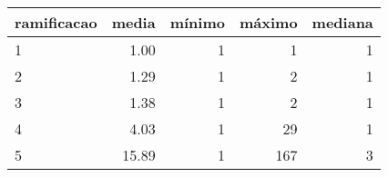 \begin{table}[ht]
\centering
\begin{tabular}{lrrrr}
  \hline
ramificacao & media & mínimo & máximo & mediana \\ 
  \hline
1 & 1.00 &   1 &   1 &   1 \\ 
  2 & 1.29 &   1 &   2 &   1 \\ 
  3 & 1.38 &   1 &   2 &   1 \\ 
  4 & 4.03 &   1 &  29 &   1 \\ 
  5 & 15.89 &   1 & 167 &   3 \\ 
   \hline
\end{tabular}
\end{table}
